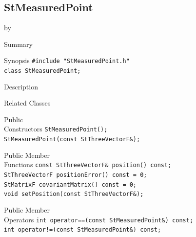 \documentclass[twoside]{article}
\newcommand{\entrylabel}[1]{\mbox{\textbf{{#1}}}\hfil}%
\newenvironment{entry}
{\begin{list}{}%
    {\renewcommand{\makelabel}{\entrylabel}%
     \setlength{\labelwidth}{90pt}%
     \setlength{\leftmargin}{\labelwidth}
     \advance\leftmargin by \labelsep%
      }%
    }%
  {\end{list}}
\newcommand{\Entrylabel}[1]%
{\raisebox{0pt}[1ex][0pt]{\makebox[\labelwidth][l]%
    {\parbox[t]{\labelwidth}{\hspace{0pt}\textbf{{#1}}}}}}
\newenvironment{Entry}%
{\renewcommand{\entrylabel}{\Entrylabel}\begin{entry}}%
  {\end{entry}}
\begin{document}
\subsection{StMeasuredPoint}
\label{sec:StMeasuredPoint}
\begin{Entry}
\item[Summary]
\item[Synopsis]
    \verb+#include "StMeasuredPoint.h"+\\
    \verb+class StMeasuredPoint;+\\
\item[Description]
\item[Related Classes]
\item[Public\\ Constructors]
    \verb+StMeasuredPoint();+\\
    \verb+StMeasuredPoint(const StThreeVectorF&);+\\
\item[Public Member\\ Functions]
    \verb+const StThreeVectorF& position() const;+\\
    \verb+StThreeVectorF positionError() const = 0;+\\
    \verb+StMatrixF covariantMatrix() const = 0;+\\
    \verb+void setPosition(const StThreeVectorF&);+\\
\item[Public Member\\ Operators]
    \verb+int operator==(const StMeasuredPoint&) const;+\\
    \verb+int operator!=(const StMeasuredPoint&) const;+\\
\end{Entry}
\clearpage
\end{document}
